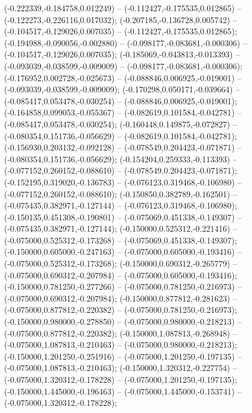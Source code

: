  (-0.222339,-0.184758,0.012249) -- (-0.112427,-0.175535,0.012865) -- (-0.122273,-0.226116,0.017032);
 (-0.207185,-0.136728,0.005742) -- (-0.104517,-0.129026,0.007035) -- (-0.112427,-0.175535,0.012865);
 (-0.194988,-0.090056,-0.002880) -- (-0.098177,-0.083681,-0.000306) -- (-0.104517,-0.129026,0.007035);
 (-0.185069,-0.043813,-0.013393) -- (-0.093039,-0.038599,-0.009009) -- (-0.098177,-0.083681,-0.000306);
 (-0.176952,0.002728,-0.025673) -- (-0.088846,0.006925,-0.019001) -- (-0.093039,-0.038599,-0.009009);
 (-0.170298,0.050171,-0.039664) -- (-0.085417,0.053478,-0.030254) -- (-0.088846,0.006925,-0.019001);
 (-0.164858,0.099053,-0.055367) -- (-0.082619,0.101584,-0.042781) -- (-0.085417,0.053478,-0.030254);
 (-0.160448,0.149875,-0.072827) -- (-0.080354,0.151736,-0.056629) -- (-0.082619,0.101584,-0.042781);
 (-0.156930,0.203132,-0.092128) -- (-0.078549,0.204423,-0.071871) -- (-0.080354,0.151736,-0.056629);
 (-0.154204,0.259333,-0.113393) -- (-0.077152,0.260152,-0.088610) -- (-0.078549,0.204423,-0.071871);
 (-0.152195,0.319020,-0.136783) -- (-0.076123,0.319468,-0.106980) -- (-0.077152,0.260152,-0.088610);
 (-0.150850,0.382789,-0.162501) -- (-0.075435,0.382971,-0.127144) -- (-0.076123,0.319468,-0.106980);
 (-0.150135,0.451308,-0.190801) -- (-0.075069,0.451338,-0.149307) -- (-0.075435,0.382971,-0.127144);
 (-0.150000,0.525312,-0.221416) -- (-0.075000,0.525312,-0.173268) -- (-0.075069,0.451338,-0.149307);
 (-0.150000,0.605000,-0.247163) -- (-0.075000,0.605000,-0.193416) -- (-0.075000,0.525312,-0.173268);
 (-0.150000,0.690312,-0.265779) -- (-0.075000,0.690312,-0.207984) -- (-0.075000,0.605000,-0.193416);
 (-0.150000,0.781250,-0.277266) -- (-0.075000,0.781250,-0.216973) -- (-0.075000,0.690312,-0.207984);
 (-0.150000,0.877812,-0.281623) -- (-0.075000,0.877812,-0.220382) -- (-0.075000,0.781250,-0.216973);
 (-0.150000,0.980000,-0.278850) -- (-0.075000,0.980000,-0.218213) -- (-0.075000,0.877812,-0.220382);
 (-0.150000,1.087813,-0.268948) -- (-0.075000,1.087813,-0.210463) -- (-0.075000,0.980000,-0.218213);
 (-0.150000,1.201250,-0.251916) -- (-0.075000,1.201250,-0.197135) -- (-0.075000,1.087813,-0.210463);
 (-0.150000,1.320312,-0.227754) -- (-0.075000,1.320312,-0.178228) -- (-0.075000,1.201250,-0.197135);
 (-0.150000,1.445000,-0.196463) -- (-0.075000,1.445000,-0.153741) -- (-0.075000,1.320312,-0.178228);
